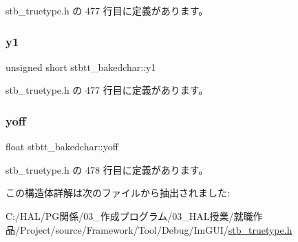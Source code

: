  stb\+\_\+truetype.\+h の 477 行目に定義があります。

\mbox{\label{structstbtt__bakedchar_ac831dc667f6c39b5d22740c6cbd5bc3f}} 
\subsubsection{\texorpdfstring{y1}{y1}}
{\footnotesize\ttfamily unsigned short stbtt\+\_\+bakedchar\+::y1}



 stb\+\_\+truetype.\+h の 477 行目に定義があります。

\mbox{\label{structstbtt__bakedchar_aba01393e52d1c6f4ce86a8b51e498bb4}} 
\subsubsection{\texorpdfstring{yoff}{yoff}}
{\footnotesize\ttfamily float stbtt\+\_\+bakedchar\+::yoff}



 stb\+\_\+truetype.\+h の 478 行目に定義があります。



この構造体詳解は次のファイルから抽出されました\+:\begin{DoxyCompactItemize}
\item 
C\+:/\+H\+A\+L/\+P\+G関係/03\+\_\+作成プログラム/03\+\_\+\+H\+A\+L授業/就職作品/\+Project/source/\+Framework/\+Tool/\+Debug/\+Im\+G\+U\+I/\mbox{\hyperlink{stb__truetype_8h}{stb\+\_\+truetype.\+h}}\end{DoxyCompactItemize}
